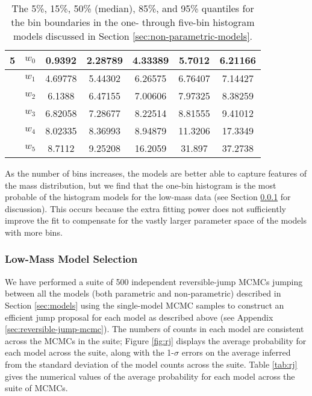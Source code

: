 \documentclass[preprint]{aastex}
\begin{document}
\begin{table}
\begin{center}
\begin{tabular}{|c|c|c|c|c|c|c|}
      \hline \hline
      5 & $w_0$ & 0.9392 & 2.28789 & 4.33389 & 5.7012 & 6.21166 \\
      \hline
        & $w_1$ & 4.69778 & 5.44302 & 6.26575 & 6.76407 & 7.14427 \\
      \hline
        & $w_2$ & 6.1388 & 6.47155 & 7.00606 & 7.97325 & 8.38259 \\
      \hline
        & $w_3$ & 6.82058 & 7.28677 & 8.22514 & 8.81555 & 9.41012 \\
      \hline
        & $w_4$ & 8.02335 & 8.36993 & 8.94879 & 11.3206 & 17.3349 \\
      \hline
        & $w_5$ & 8.7112 & 9.25208 & 16.2059 & 31.897 & 37.2738 \\
      \hline
    \end{tabular}
  \end{center}
  \caption{\label{tab:low-mass-non-parametric} The 5\%, 15\%, 50\%
    (median), 85\%, and 95\% quantiles for the bin boundaries in the
    one- through five-bin histogram models discussed in Section
    \ref{sec:non-parametric-models}.}
\end{table}

As the number of bins increases, the models are better able to capture
features of the mass distribution, but we find that the one-bin
histogram is the most probable of the histogram models for the
low-mass data (see Section \ref{sec:low-mass-model-selection} for
discussion).  This occurs because the extra fitting power does not
sufficiently improve the fit to compensate for the vastly larger
parameter space of the models with more bins.

\subsubsection{Low-Mass Model Selection}
\label{sec:low-mass-model-selection}
We have performed a suite of 500 independent reversible-jump MCMCs
jumping between all the models (both parametric and non-parametric)
described in Section \ref{sec:models} using the single-model MCMC
samples to construct an efficient jump proposal for each model as
described above (see Appendix \ref{sec:reversible-jump-mcmc}).  The
numbers of counts in each model are consistent across the MCMCs in the
suite; Figure \ref{fig:rj} displays the average probability for each
model across the suite, along with the 1-$\sigma$ errors on the
average inferred from the standard deviation of the model counts
across the suite.  Table \ref{tab:rj} gives the numerical values of
the average probability for each model across the suite of MCMCs.
\end{document}
